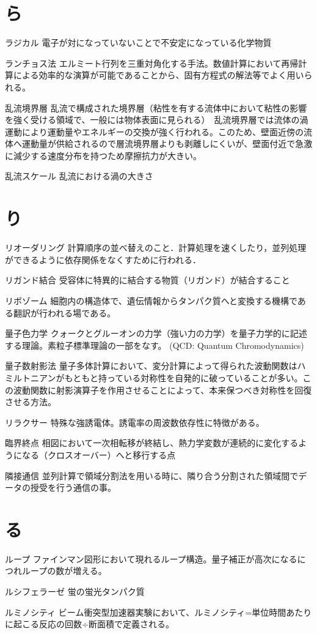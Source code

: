 \begin{用語集}
\section{ら}
\item{ラジカル}{}
{電子が対になっていないことで不安定になっている化学物質}
\item{ランチョス法}{}
{エルミート行列を三重対角化する手法。数値計算において再帰計算による効率的な演算が可能であることから、固有方程式の解法等でよく用いられる。}
\item{乱流境界層}{}
{乱流で構成された境界層（粘性を有する流体中において粘性の影響を強く受ける領域で、一般には物体表面に見られる）　乱流境界層では流体の渦運動により運動量やエネルギーの交換が強く行われる。このため、壁面近傍の流体へ運動量が供給されるので層流境界層よりも剥離しにくいが、壁面付近で急激に減少する速度分布を持つため摩擦抗力が大きい。}
\item{乱流スケール}{}
{乱流における渦の大きさ}
\section{り}
\item{リオーダリング}{}
{計算順序の並べ替えのこと．計算処理を速くしたり，並列処理ができるように依存関係をなくすために行われる．}
\item{リガンド結合}{}
{受容体に特異的に結合する物質（リガンド）が結合すること}
\item{リボゾーム}{}
{細胞内の構造体で、遺伝情報からタンパク質へと変換する機構である翻訳が行われる場である。}
\item{量子色力学}{}
{クォークとグルーオンの力学（強い力の力学）を量子力学的に記述する理論。素粒子標準理論の一部をなす。 (QCD: Quantum Chromodynamics)}
\item{量子数射影法}{}
{量子多体計算において、変分計算によって得られた波動関数はハミルトニアンがもともと持っている対称性を自発的に破っていることが多い。この波動関数に射影演算子を作用させることによって、本来保つべき対称性を回復させる方法。}
\item{リラクサー}{}
{特殊な強誘電体。誘電率の周波数依存性に特徴がある。}
\item{臨界終点}{}
{相図において一次相転移が終結し、熱力学変数が連続的に変化するようになる（クロスオーバー）へと移行する点}
\item{隣接通信}{}
{並列計算で領域分割法を用いる時に、隣り合う分割された領域間でデータの授受を行う通信の事。}
\section{る}
\item{ループ}{}
{ファインマン図形において現れるループ構造。量子補正が高次になるにつれループの数が増える。}
\item{ルシフェラーゼ}{}
{蛍の蛍光タンパク質}
\item{ルミノシティ}{}
{ビーム衝突型加速器実験において、ルミノシティ=単位時間あたりに起こる反応の回数÷断面積で定義される。}

\end{用語集}
